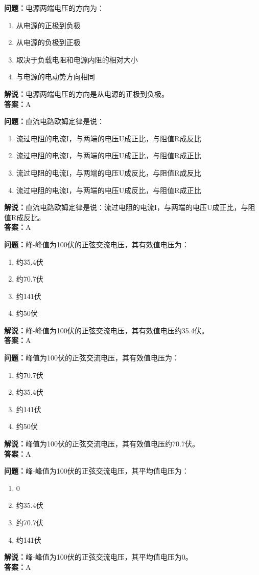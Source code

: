 \documentclass{ctexbook}%
\begin{document}
\textbf{问题：}电源两端电压的方向为：
\begin{enumerate}[label=\Alph*), leftmargin=3em]
\item 从电源的正极到负极
\item 从电源的负极到正极
\item 取决于负载电阻和电源内阻的相对大小
\item 与电源的电动势方向相同
\end{enumerate}
\textbf{解说：}电源两端电压的方向是从电源的正极到负极。\\
\textbf{答案：}A

\textbf{问题：}直流电路欧姆定律是说：
\begin{enumerate}[label=\Alph*), leftmargin=3em]
\item 流过电阻的电流I，与两端的电压U成正比，与阻值R成反比
\item 流过电阻的电流I，与两端的电压U成正比，与阻值R成正比
\item 流过电阻的电流I，与两端的电压U成反比，与阻值R成反比
\item 流过电阻的电流I，与两端的电压U成反比，与阻值R成正比
\end{enumerate}
\textbf{解说：}直流电路欧姆定律是说：流过电阻的电流I，与两端的电压U成正比，与阻值R成反比。\\
\textbf{答案：}A

\textbf{问题：}峰-峰值为100伏的正弦交流电压，其有效值电压为：
\begin{enumerate}[label=\Alph*), leftmargin=3em]
\item 约35.4伏
\item 约70.7伏
\item 约141伏
\item 约50伏
\end{enumerate}
\textbf{解说：}峰-峰值为100伏的正弦交流电压，其有效值电压约35.4伏。\\
\textbf{答案：}A

\textbf{问题：}峰值为100伏的正弦交流电压，其有效值电压为：
\begin{enumerate}[label=\Alph*), leftmargin=3em]
\item 约70.7伏
\item 约35.4伏
\item 约141伏
\item 约50伏
\end{enumerate}
\textbf{解说：}峰值为100伏的正弦交流电压，其有效值电压约70.7伏。\\
\textbf{答案：}A

\textbf{问题：}峰-峰值为100伏的正弦交流电压，其平均值电压为：
\begin{enumerate}[label=\Alph*), leftmargin=3em]
\item 0
\item 约35.4伏
\item 约70.7伏
\item 约141伏
\end{enumerate}
\textbf{解说：}峰-峰值为100伏的正弦交流电压，其平均值电压为0。\\
\textbf{答案：}A
\end{document}
